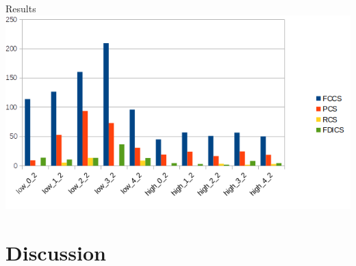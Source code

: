\documentclass[aspectratio=169]{beamer}
\begin{document}
\begin{frame}{Results}
	\centering
	\includegraphics[scale=0.5]{percentage_improv}
\end{frame}

\section{Discussion}
\end{document}
